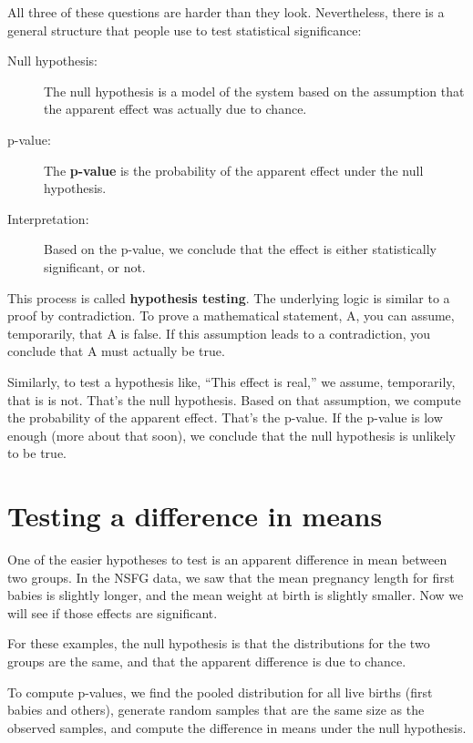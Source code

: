 \documentclass[10pt]{book}
\begin{document}
All three of these questions are harder than they look.  Nevertheless,
there is a general structure that people use to test statistical
significance:

\begin{description}

\item[Null hypothesis:] The null hypothesis is a model of the system
  based on the assumption that the apparent effect was actually due to
  chance.

\item[p-value:] The {\bf p-value} is the probability of the apparent
  effect under the null hypothesis.

\item[Interpretation:] Based on the p-value, we conclude that the
  effect is either statistically significant, or not.

\end{description}

This process is called {\bf hypothesis testing}.  The underlying
logic is similar to a proof by contradiction.  To prove a mathematical
statement, A, you can assume, temporarily, that A is false.  If this
assumption leads to a contradiction, you conclude that A must actually
be true.

Similarly, to test a hypothesis like, ``This effect is real,'' we
assume, temporarily, that is is not.  That's the null hypothesis.
Based on that assumption, we compute the probability of the apparent
effect.  That's the p-value.  If the p-value is low enough (more about
that soon), we conclude that the null hypothesis is unlikely to be
true.


\section{Testing a difference in means}

One of the easier hypotheses to test is an apparent difference in mean
between two groups.  In the NSFG data, we saw that the mean pregnancy
length for first babies is slightly longer, and the mean weight at
birth is slightly smaller.  Now we will see if those effects are
significant.

For these examples, the null hypothesis is that the distributions
for the two groups are the same, and that the apparent difference is
due to chance.

To compute p-values, we find the pooled distribution for all live
births (first babies and others), generate random samples that are
the same size as the observed samples, and compute the difference
in means under the null hypothesis.
\end{document}
